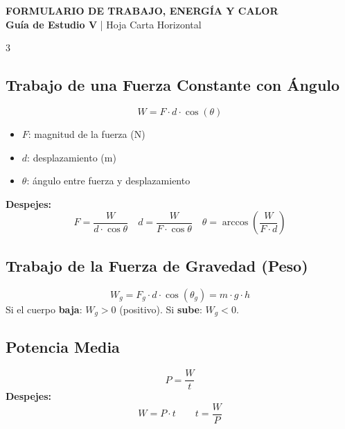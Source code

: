 \documentclass[10pt,landscape]{article}
\begin{document}
\pagecolor{white}

\begin{center}
{\Huge\bfseries\color{primary} FORMULARIO DE TRABAJO, ENERG\'{I}A Y CALOR}\\[2pt]
{\large\color{darkbg}\textbf{Gu\'{i}a de Estudio V} | Hoja Carta Horizontal}
\end{center}
\vspace{-4pt}

\begin{multicols}{3}



\subsection*{Trabajo de una Fuerza Constante con \'{A}ngulo}
\[
\boxed{W = F \cdot d \cdot \cos(\theta)}
\]
\begin{itemize}[leftmargin=*,nosep,topsep=0pt]
  \item $F$: magnitud de la fuerza (N)
  \item $d$: desplazamiento (m)
  \item $\theta$: \'{a}ngulo entre fuerza y desplazamiento
\end{itemize}

\textbf{Despejes:}
\[
F = \frac{W}{d \cdot \cos\theta} \quad d = \frac{W}{F \cdot \cos\theta} \quad \theta = \arccos\!\left(\frac{W}{F \cdot d}\right)
\]

\subsection*{Trabajo de la Fuerza de Gravedad (Peso)}
\[
\boxed{W_g = F_g \cdot d \cdot \cos(\theta_g) = m \cdot g \cdot h}
\]
Si el cuerpo \textbf{baja}: $W_g > 0$ (positivo). Si \textbf{sube}: $W_g < 0$.

\vspace{4pt}

\subsection*{Potencia Media}
\[
\boxed{P = \frac{W}{t}}
\]
\textbf{Despejes:}
\[
W = P \cdot t \qquad t = \frac{W}{P}
\]


\end{multicols}
\end{document}
